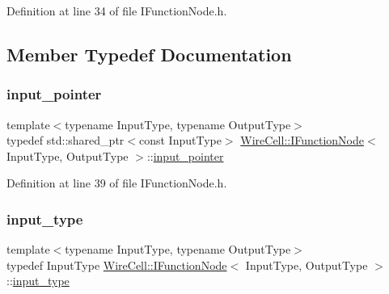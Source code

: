 Definition at line 34 of file I\+Function\+Node.\+h.



\subsection{Member Typedef Documentation}
\mbox{\label{class_wire_cell_1_1_i_function_node_a55c0946156df9b712b8ad1a0b59b2db6}} 
\subsubsection{\texorpdfstring{input\+\_\+pointer}{input\_pointer}}
{\footnotesize\ttfamily template$<$typename Input\+Type, typename Output\+Type$>$ \\
typedef std\+::shared\+\_\+ptr$<$const Input\+Type$>$ \hyperlink{class_wire_cell_1_1_i_function_node}{Wire\+Cell\+::\+I\+Function\+Node}$<$ Input\+Type, Output\+Type $>$\+::\hyperlink{class_wire_cell_1_1_i_function_node_a55c0946156df9b712b8ad1a0b59b2db6}{input\+\_\+pointer}}



Definition at line 39 of file I\+Function\+Node.\+h.

\mbox{\label{class_wire_cell_1_1_i_function_node_ab27279ed0322558701ea180c0b01ebb4}} 
\subsubsection{\texorpdfstring{input\+\_\+type}{input\_type}}
{\footnotesize\ttfamily template$<$typename Input\+Type, typename Output\+Type$>$ \\
typedef Input\+Type \hyperlink{class_wire_cell_1_1_i_function_node}{Wire\+Cell\+::\+I\+Function\+Node}$<$ Input\+Type, Output\+Type $>$\+::\hyperlink{class_wire_cell_1_1_i_function_node_ab27279ed0322558701ea180c0b01ebb4}{input\+\_\+type}}



